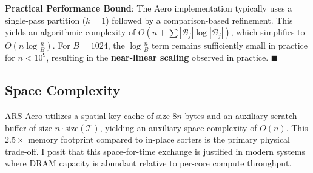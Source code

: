 \textbf{Practical Performance Bound}: The Aero implementation typically uses a single-pass partition ($k=1$) followed by a comparison-based refinement.
This yields an algorithmic complexity of $O(n + \sum |\mathcal{B}_j| \log |\mathcal{B}_j|)$, which simplifies to $O(n \log \frac{n}{B})$.
For $B=1024$, the $\log \frac{n}{B}$ term remains sufficiently small in practice for $n < 10^9$, resulting in the \textbf{near-linear scaling} observed in practice. $\blacksquare$

\subsection{Space Complexity}
ARS Aero utilizes a spatial key cache of size $8n$ bytes and an auxiliary scratch buffer of size $n \cdot \text{size}(\mathcal{T})$, yielding an auxiliary space complexity of $O(n)$.
This $2.5\times$ memory footprint compared to in-place sorters is the primary physical trade-off.
I posit that this space-for-time exchange is justified in modern systems where DRAM capacity is abundant relative to per-core compute throughput.
